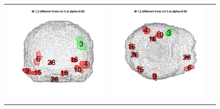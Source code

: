 \documentclass[12pt]{article}
\begin{document}
\begin{figure}[h]
\begin{tabular}{ccc}
\includegraphics[scale = 0.24]{../a7plots/d_2r_3_view2.png} & 
\includegraphics[scale = 0.24]{../a7plots/d_2r_3_view3.png} \\ 

\end{tabular}
\end{figure}
\end{document}

